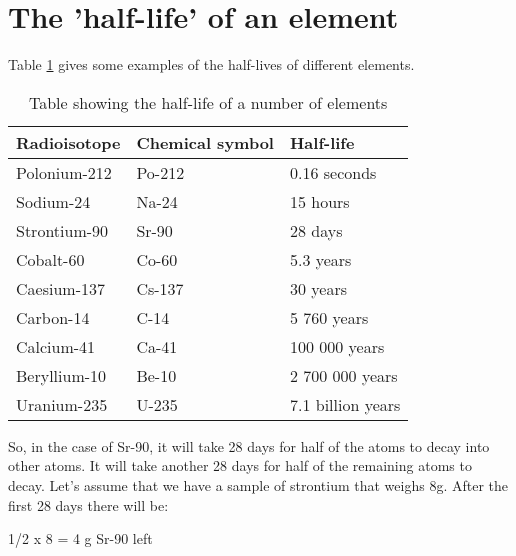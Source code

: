 



\section{The 'half-life' of an element}
\label{sec:an:halflife}


Table \ref{tab:an:r} gives some examples of the half-lives of different elements.\\

\begin{table}[!h]
\begin{center}
\caption{Table showing the half-life of a number of elements}

\begin{tabular}{|l|l|l|}\hline
\textbf{Radioisotope} & \textbf{Chemical symbol} & \textbf{Half-life}\\\hline\hline
Polonium-212 & Po-212 & 0.16 seconds\\\hline
Sodium-24 & Na-24 & 15 hours\\\hline
Strontium-90 & Sr-90 & 28 days\\\hline
Cobalt-60 & Co-60 & 5.3 years\\\hline
Caesium-137 & Cs-137 & 30 years\\\hline
Carbon-14 & C-14 & 5 760 years\\\hline
Calcium-41 & Ca-41 & 100 000 years\\\hline
Beryllium-10 & Be-10 & 2 700 000 years\\\hline
Uranium-235 & U-235 & 7.1 billion years\\\hline\hline
\end{tabular}
\label{tab:an:r}

\end{center}
\end{table}

So, in the case of Sr-90, it will take 28 days for half of the atoms to decay into other atoms. It will take another 28 days for half of the remaining atoms to decay. Let's assume that we have a sample of strontium that weighs 8g. After the first 28 days there will be:

\begin{center}
1/2 x 8 = 4 g Sr-90 left
\end{center}


